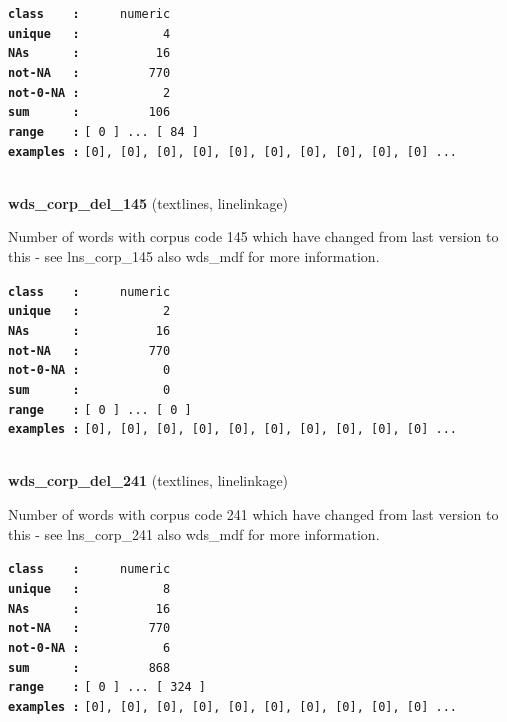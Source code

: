 \documentclass[]{article}
\begin{document}
\textbf{\texttt{class\ \ \ \ :}} \texttt{~~~~~numeric}\\
\textbf{\texttt{unique\ \ \ :}} \texttt{~~~~~~~~~~~4}\\
\textbf{\texttt{NAs\ \ \ \ \ \ :}} \texttt{~~~~~~~~~~16}\\
\textbf{\texttt{not-NA\ \ \ :}} \texttt{~~~~~~~~~770}\\
\textbf{\texttt{not-0-NA\ :}} \texttt{~~~~~~~~~~~2}\\
\textbf{\texttt{sum\ \ \ \ \ \ :}} \texttt{~~~~~~~~~106}\\
\textbf{\texttt{range\ \ \ \ :}}
\texttt{{[}\ 0\ {]}\ ...\ {[}\ 84\ {]}}\\
\textbf{\texttt{examples\ :}}
\texttt{{[}0{]},\ {[}0{]},\ {[}0{]},\ {[}0{]},\ {[}0{]},\ {[}0{]},\ {[}0{]},\ {[}0{]},\ {[}0{]},\ {[}0{]}\ ...}\\

~

\textbf{wds\_corp\_del\_145} (textlines, linelinkage)

Number of words with corpus code 145 which have changed from last
version to this - see lns\_corp\_145 also wds\_mdf for more information.

\textbf{\texttt{class\ \ \ \ :}} \texttt{~~~~~numeric}\\
\textbf{\texttt{unique\ \ \ :}} \texttt{~~~~~~~~~~~2}\\
\textbf{\texttt{NAs\ \ \ \ \ \ :}} \texttt{~~~~~~~~~~16}\\
\textbf{\texttt{not-NA\ \ \ :}} \texttt{~~~~~~~~~770}\\
\textbf{\texttt{not-0-NA\ :}} \texttt{~~~~~~~~~~~0}\\
\textbf{\texttt{sum\ \ \ \ \ \ :}} \texttt{~~~~~~~~~~~0}\\
\textbf{\texttt{range\ \ \ \ :}}
\texttt{{[}\ 0\ {]}\ ...\ {[}\ 0\ {]}}\\
\textbf{\texttt{examples\ :}}
\texttt{{[}0{]},\ {[}0{]},\ {[}0{]},\ {[}0{]},\ {[}0{]},\ {[}0{]},\ {[}0{]},\ {[}0{]},\ {[}0{]},\ {[}0{]}\ ...}\\

~

\textbf{wds\_corp\_del\_241} (textlines, linelinkage)

Number of words with corpus code 241 which have changed from last
version to this - see lns\_corp\_241 also wds\_mdf for more information.

\textbf{\texttt{class\ \ \ \ :}} \texttt{~~~~~numeric}\\
\textbf{\texttt{unique\ \ \ :}} \texttt{~~~~~~~~~~~8}\\
\textbf{\texttt{NAs\ \ \ \ \ \ :}} \texttt{~~~~~~~~~~16}\\
\textbf{\texttt{not-NA\ \ \ :}} \texttt{~~~~~~~~~770}\\
\textbf{\texttt{not-0-NA\ :}} \texttt{~~~~~~~~~~~6}\\
\textbf{\texttt{sum\ \ \ \ \ \ :}} \texttt{~~~~~~~~~868}\\
\textbf{\texttt{range\ \ \ \ :}}
\texttt{{[}\ 0\ {]}\ ...\ {[}\ 324\ {]}}\\
\textbf{\texttt{examples\ :}}
\texttt{{[}0{]},\ {[}0{]},\ {[}0{]},\ {[}0{]},\ {[}0{]},\ {[}0{]},\ {[}0{]},\ {[}0{]},\ {[}0{]},\ {[}0{]}\ ...}\\
\end{document}
